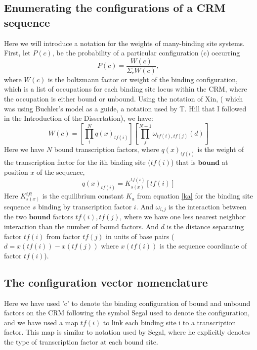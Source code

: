 \subsection{Enumerating the configurations of a CRM sequence }

 Here we will introduce a notation for the weights of many-binding site systems.  First, let $P(c)$, be the probability of a particular configuration (c) occurring
\begin{equation}\label{mbody}
    P(c) = \frac{W(c)}{\Sigma_c W(c)},
\end{equation}
where $ W(c)$ is the boltzmann factor or weight of the binding configuration, which is a list of occupations for each binding site locus within the CRM, where the occupation is either bound or unbound.   Using the notation of Xin, ( which was using Buchler's model as a guide\cite{pmid20862354}\cite{pmid12702751}, a notation used by T. Hill that I followed in the Introduction of the Dissertation), we have:
\begin{equation}\label{wc}
    W(c)=  [\prod_i^N q(x)_{tf(i)} ] [\prod_{j}^{N-1} \omega_{tf(i),tf(j)}(d)]
\end{equation}
Here we have $N$ bound transcription factors, where $q(x)_{tf(i)}$ is the weight of the transcription factor for the ith binding site ($tf(i)$) that is $\textbf{bound}$ at position $x$ of the sequence, 
\begin{equation}\label{partitionf}
    q(x)_{tf(i)} = K_{s(x)}^{tf(i)} [tf(i)]
\end{equation}
Here $ K_{s(x)}^{tf{i}}$ is the equilibrium constant $K_a$ from equation \eqref{ka} for the binding site sequence $s$ binding by transcription factor $i$.  And $\omega_{i,j}$ is the interaction between the two $\textbf{bound}$ factors $tf(i),tf(j)$, where we have one less nearest neighbor interaction than the number of bound factors.  And $d$ is the distance separating factor $tf(i)$ from factor $tf(j)$ in units of base pairs ( $d = x(tf(i)) - x(tf(j))$ where $x(tf(i))$ is the sequence coordinate of factor $tf(i)$).
\subsection{The configuration vector nomenclature}

 Here we have used 'c' to denote the binding configuration of bound and unbound factors on the CRM following the symbol Segal used to denote the configuration, and we have used a map $tf(i)$ to link each binding site i to a transcription factor.  This map is similar to notation used by Segal, where he explicitly denotes the type of transcription factor at each bound site.
 
